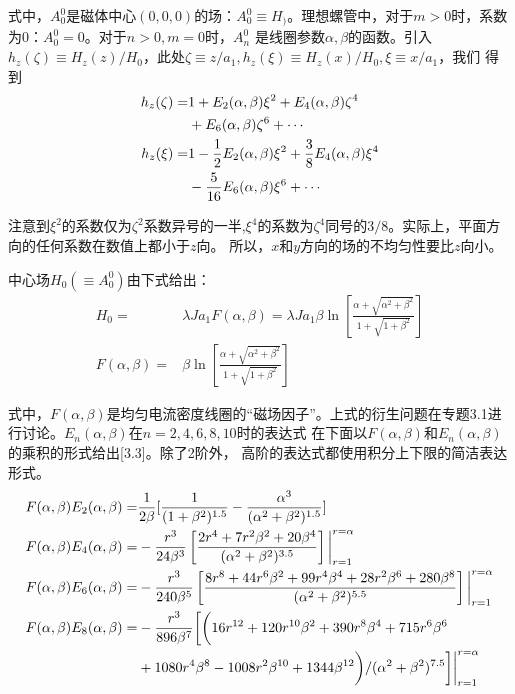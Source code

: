 式中，$A_0^0$是磁体中心$(0,0,0)$的场：$A_0^0\equiv H_)$。理想螺管中，对于$m>0$时，系数为0：$A_0^0=0$。对于$n>0, m=0$时，$A_n^0$
是线圈参数$\alpha, \beta$的函数。引入$h_z(\zeta)\equiv H_z(z)/H_0$，此处$\zeta \equiv z/a_1, h_z(\xi)\equiv H_z(x)/H_0, \xi\equiv x/a_1$，我们
得到
\begin{subequations}\label{eqn:solenoid coil hz2}
	\begin{align}
h_z(\zeta)=&1+E_2(\alpha,\beta)\xi^2+E_4(\alpha,\beta)\zeta^4\notag\\
&+E_6(\alpha,\beta)\zeta^6+\cdots \\
h_z(\xi) =&1-\frac{1}{2}E_2(\alpha,\beta)\xi^2+\frac{3}{8}E_4(\alpha,\beta)\xi^4\notag\\
&-\frac{5}{16}E_6(\alpha,\beta)\xi^6+\cdots
	\end{align}
\end{subequations}

注意到$\xi^2$的系数仅为$\zeta^2$系数异号的一半,$\xi^4$的系数为$\zeta^4$同号的$3/8$。实际上，平面方向的任何系数在数值上都小于$z$向。
所以，$x$和$y$方向的场的不均匀性要比$z$向小。

中心场$H_0(\equiv A_0^0)$由下式给出：
\begin{subequations}\label{eqn:h0}
	\begin{align}
  H_0=&\lambda J a_1 F(\alpha,\beta)=\lambda J a_1 \beta \ln \left[\frac{\alpha+\sqrt{\alpha^2+\beta^2}}{1+\sqrt{1+\beta^2}}\right] \\
  F(\alpha,\beta)=&\beta \ln \left[\frac{\alpha+\sqrt{\alpha^2+\beta^2}}{1+\sqrt{1+\beta^2}}\right]
  	\end{align}
\end{subequations}

式中，$F(\alpha,\beta)$是均匀电流密度线圈的“磁场因子”。上式的衍生问题在专题3.1进行讨论。$E_n (\alpha,\beta)$在$n=2,4,6,8,10$时的表达式
在下面以$F(\alpha,\beta)$和$E_n(\alpha,\beta)$的乘积的形式给出[3.3]。除了2阶外，
高阶的表达式都使用积分上下限的简洁表达形式。
\begin{subequations}
\begin{align}
F(\alpha,\beta) E_2(\alpha,\beta)=& \frac{1}{2\beta}[\frac{1}{(1+\beta^2)^{1.5}}-\frac{\alpha^3}{(\alpha^2+\beta^2)^{1.5}}]\\
F(\alpha,\beta)E_4(\alpha,\beta)=&-\frac{r^3}{24\beta^3}\left[\frac{2r^4+7r^2\beta^2+20\beta^4}{(\alpha^2+\beta^2)^{3.5}}\right]\bigg|_{r=1}^{r=\alpha}\\
F(\alpha,\beta)E_6(\alpha,\beta)=&-\frac{r^3}{240\beta^5}\left[\frac{8r^8+44 r^6\beta^2+99 r^4\beta^4+28 r^2 \beta^6+280 \beta^8}{(\alpha^2+\beta^2)^{5.5}}\right]\bigg|_{r=1}^{r=\alpha}\\
F(\alpha,\beta)E_8(\alpha,\beta)=&-\frac{r^3}{896\beta^7}\bigg[\bigg(16 r^{12}+120 r^{10}\beta^2+390r^8\beta^4+715r^6\beta^6\notag\\
&+1080r^4\beta^8-1008r^2\beta^{10}+1344\beta^{12}\bigg)/(\alpha^2+\beta^2)^{7.5}\bigg]\bigg|_{r=1}^{r=\alpha}
\end{align}
\end{subequations}


